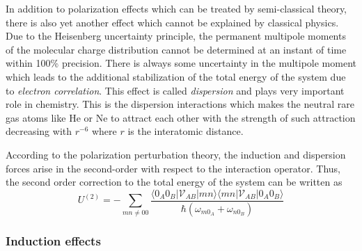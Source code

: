 \documentclass[a4paper,titlepage,twoside,fleqn,12pt]{book}
\begin{document}
\begin{refsection}
In addition to polarization effects which can be treated
by semi\hyp{}classical theory, there is also yet another effect
which cannot be explained by classical physics. Due to the Heisenberg
uncertainty principle, the permanent multipole moments of the 
molecular charge distribution cannot be determined at an instant
of time within 100\% precision. There is always some uncertainty
in the multipole moment which leads to the additional stabilization
of the total energy of the system due to \emph{electron correlation}. This effect is
called \emph{dispersion} and plays very important role in chemistry.
This is the dispersion interactions which makes the neutral rare gas atoms 
like He or Ne
to attract each other with the strength of such attraction decreasing
with $r^{-6}$ where $r$ is the interatomic distance.

According to the polarization perturbation theory, the induction
and dispersion forces arise in the second\hyp{}order with respect to
the interaction 
operator.\citep{Stone.TheTheoryOfIntermolecularForces.1996,
Jeziorski.Moszynski.Szalewicz.ChemRev.1994} 
Thus, the second order correction to the total
energy of the system can be written as
%
\begin{equation} \label{e:eint-2}
U^{(2)} = - \sum_{mn\ne 00} \frac{
\langle 0_A0_B \lvert \mathscr{V}_{AB} \rvert mn \rangle \langle  mn \lvert \mathscr{V}_{AB} \rvert 0_A0_B \rangle
}{\hbar \left( \omega_{m0_A} + \omega_{n0_B}\right)}
\end{equation}
%

\subsubsection{Induction effects}


\end{refsection}
\end{document}
